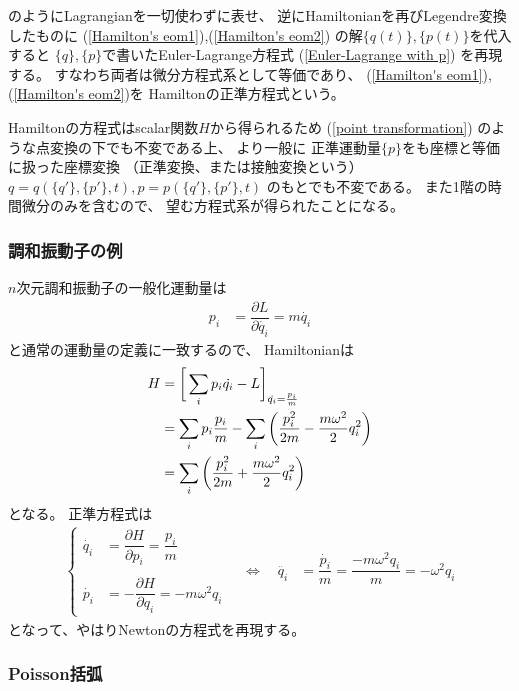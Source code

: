 のようにLagrangianを一切使わずに表せ、
逆にHamiltonianを再びLegendre変換したものに
(\ref{Hamilton's eom1}),(\ref{Hamilton's eom2})
の解$\{q(t)\},\{p(t)\}$を代入すると
$\{q\},\{p\}$で書いたEuler-Lagrange方程式
(\ref{Euler-Lagrange with p})
を再現する。
すなわち両者は微分方程式系として等価であり、
(\ref{Hamilton's eom1}), 
(\ref{Hamilton's eom2})を
Hamiltonの正準方程式という。

Hamiltonの方程式はscalar関数$H$から得られるため
(\ref{point transformation})
のような点変換の下でも不変である上、
より一般に
正準運動量$\{p\}$をも座標と等価に扱った座標変換
（正準変換、または接触変換という）
$q = q(\{q'\}, \{p'\}, t ) ,
p = p(\{q'\}, \{p'\}, t )
$
のもとでも不変である。
また1階の時間微分のみを含むので、
望む方程式系が得られたことになる。

\subsubsection{調和振動子の例}

$n$次元調和振動子の一般化運動量は
\begin{align}
  p_i &= \dfrac{\partial L}{\partial \dot{q_i}}
=
  m \dot{q_i}
\end{align}
と通常の運動量の定義に一致するので、
Hamiltonianは
\begin{align}
  H &= \bigg[
    \sum_i p_i \dot{q_i}
    - L
    \bigg]_{ \dot{q_i} = \frac{p_i}{m} }
\notag\\&=
    \sum_i p_i \frac{p_i}{m}
    - 
      \sum_i \bigg(
      \dfrac{p_i^2}{2m}
    -
      \dfrac{ m \omega^2 }{2}
      q_i^2
    \bigg)
\notag\\&=
    \sum_i \bigg(
      \dfrac{p_i^2}{2m}
    +
      \dfrac{ m \omega^2 }{2}
      q_i^2
    \bigg)
\end{align}
となる。
正準方程式は
\begin{align}
  \begin{cases}
    \dot{q_i} &= \dfrac{\partial H}{\partial p_i}
    = \dfrac{p_i}{m}
  \\\\
    \dot{p_i} &= - \dfrac{\partial H}{\partial q_i}
    = - m \omega^2 q_i  
  \end{cases}
\quad
\Leftrightarrow
\quad
  \ddot{q_i} &= \dfrac{\dot{p_i}}{m}
  = \dfrac{- m \omega^2 q_i}{m} 
  = - \omega^2 q_i
\label{hamiltonian e.o.m for harmonic oscillator}
\end{align}
となって、やはりNewtonの方程式を再現する。

\subsubsection{Poisson括弧}

